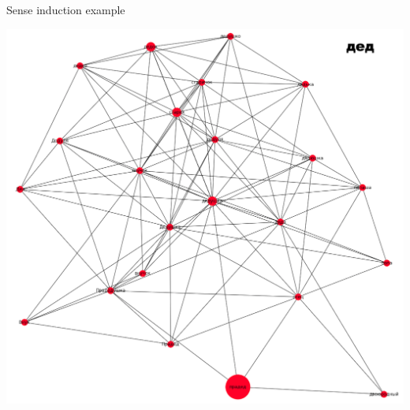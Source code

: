 \begin{frame}{ Sense induction  example}

 \begin{center}
  	\includegraphics[height=0.68\textheight]{figures/ded}
  \end{center}
  
\end{frame}






